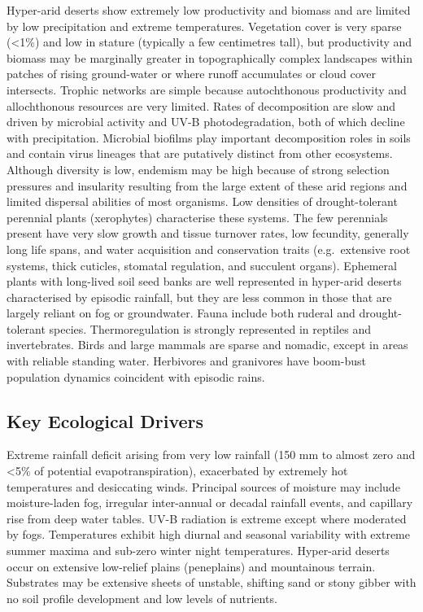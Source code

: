 \documentclass[
  letterpaper,
  DIV=11,
  numbers=noendperiod]{scrartcl}
\begin{document}
Hyper-arid deserts show extremely low productivity and biomass and are
limited by low precipitation and extreme temperatures. Vegetation cover
is very sparse (\textless1\%) and low in stature (typically a few
centimetres tall), but productivity and biomass may be marginally
greater in topographically complex landscapes within patches of rising
ground-water or where runoff accumulates or cloud cover intersects.
Trophic networks are simple because autochthonous productivity and
allochthonous resources are very limited. Rates of decomposition are
slow and driven by microbial activity and UV-B photodegradation, both of
which decline with precipitation. Microbial biofilms play important
decomposition roles in soils and contain virus lineages that are
putatively distinct from other ecosystems. Although diversity is low,
endemism may be high because of strong selection pressures and
insularity resulting from the large extent of these arid regions and
limited dispersal abilities of most organisms. Low densities of
drought-tolerant perennial plants (xerophytes) characterise these
systems. The few perennials present have very slow growth and tissue
turnover rates, low fecundity, generally long life spans, and water
acquisition and conservation traits (e.g.~extensive root systems, thick
cuticles, stomatal regulation, and succulent organs). Ephemeral plants
with long-lived soil seed banks are well represented in hyper-arid
deserts characterised by episodic rainfall, but they are less common in
those that are largely reliant on fog or groundwater. Fauna include both
ruderal and drought-tolerant species. Thermoregulation is strongly
represented in reptiles and invertebrates. Birds and large mammals are
sparse and nomadic, except in areas with reliable standing water.
Herbivores and granivores have boom-bust population dynamics coincident
with episodic rains.

\subsection{Key Ecological Drivers}\label{key-ecological-drivers-92}

Extreme rainfall deficit arising from very low rainfall (150 mm to
almost zero and \textless5\% of potential evapotranspiration),
exacerbated by extremely hot temperatures and desiccating winds.
Principal sources of moisture may include moisture-laden fog, irregular
inter-annual or decadal rainfall events, and capillary rise from deep
water tables. UV-B radiation is extreme except where moderated by fogs.
Temperatures exhibit high diurnal and seasonal variability with extreme
summer maxima and sub-zero winter night temperatures. Hyper-arid deserts
occur on extensive low-relief plains (peneplains) and mountainous
terrain. Substrates may be extensive sheets of unstable, shifting sand
or stony gibber with no soil profile development and low levels of
nutrients.
\end{document}
